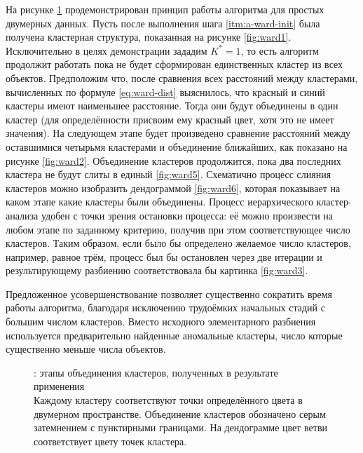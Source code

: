 \documentclass[12pt]{diploma}
\begin{document}
	На рисунке \ref{fig:ward-working} продемонстрирован принцип работы алгоритма \AWard для простых двумерных данных. Пусть после выполнения шага \ref{itm:a-ward-init} была получена кластерная структура, показанная на рисунке \ref{fig:ward1}. Исключительно в целях демонстрации зададим $ K^*=1 $, то есть алгоритм продолжит работать пока не будет сформирован единственных кластер из всех объектов. Предположим что, после сравнения всех расстояний между кластерами, вычисленных по формуле \eqref{eq:ward-dist} выяснилось, что красный и синий кластеры имеют наименьшее расстояние. Тогда они будут объединены в один кластер (для определённости присвоим ему красный цвет, хотя это не имеет значения). На следующем этапе будет произведено сравнение расстояний между оставшимися четырьмя кластерами и объединение ближайших, как показано на рисунке \ref{fig:ward2}. Объединение кластеров продолжится, пока два последних кластера не будут слиты в единый \ref{fig:ward5}. Схематично процесс слияния кластеров можно изобразить дендограммой \ref{fig:ward6}, которая показывает на каком этапе какие кластеры были объединены. Процесс иерархического кластер-анализа удобен с точки зрения остановки процесса: её можно произвести на любом этапе по заданному критерию, получив при этом соответствующее число кластеров. Таким образом, если было бы определено желаемое число кластеров, например, равное трём, процесс был бы остановлен через две итерации и результирующему разбиению соответствовала бы картинка \ref{fig:ward3}.
	
	Предложенное усовершенствование позволяет существенно сократить время работы алгоритма, благодаря исключению трудоёмких начальных стадий с большим числом кластеров. Вместо исходного элементарного разбиения используется предварительно найденные аномальные кластеры, число которые существенно меньше числа объектов.

	\begin{figure} %
		\centering
		\caption{\AWard: этапы объединения кластеров, полученных в результате применения \ikmeans
			\\ {\small Каждому кластеру соответствуют точки определённого цвета в двумерном пространстве. Объединение кластеров обозначено серым затемнением с пунктирными границами.  На дендограмме цвет ветви соответствует цвету точек кластера.}}
		\label{fig:ward-working}
	\end{figure}
	
\end{document}
